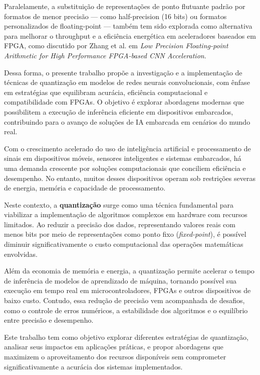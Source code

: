 \documentclass[12pt]{article}
\begin{document}
Paralelamente, a substituição de representações de ponto flutuante padrão por formatos de menor precisão — como half-precision (16 bits) ou formatos personalizados de floating-point — também tem sido explorada como alternativa para melhorar o throughput e a eficiência energética em aceleradores baseados em FPGA, como discutido por Zhang et al. em \textit{Low Precision Floating-point Arithmetic for High Performance FPGA-based CNN Acceleration}.

Dessa forma, o presente trabalho propõe a investigação e a implementação de técnicas de quantização em modelos de redes neurais convolucionais, com ênfase em estratégias que equilibram acurácia, eficiência computacional e compatibilidade com FPGAs. O objetivo é explorar abordagens modernas que possibilitem a execução de inferência eficiente em dispositivos embarcados, contribuindo para o avanço de soluções de IA embarcada em cenários do mundo real.

Com o crescimento acelerado do uso de inteligência artificial e processamento de sinais em dispositivos móveis, sensores inteligentes e sistemas embarcados, há uma demanda crescente por soluções computacionais que conciliem eficiência e desempenho. No entanto, muitos desses dispositivos operam sob restrições severas de energia, memória e capacidade de processamento.

Neste contexto, a \textbf{quantização} surge como uma técnica fundamental para viabilizar a implementação de algoritmos complexos em hardware com recursos limitados. Ao reduzir a precisão dos dados, representando valores reais com menos bits por meio de representações como ponto fixo (\textit{fixed-point}), é possível diminuir significativamente o custo computacional das operações matemáticas envolvidas.

Além da economia de memória e energia, a quantização permite acelerar o tempo de inferência de modelos de aprendizado de máquina, tornando possível sua execução em tempo real em microcontroladores, FPGAs e outros dispositivos de baixo custo. Contudo, essa redução de precisão vem acompanhada de desafios, como o controle de erros numéricos, a estabilidade dos algoritmos e o equilíbrio entre precisão e desempenho.

Este trabalho tem como objetivo explorar diferentes estratégias de quantização, analisar seus impactos em aplicações práticas, e propor abordagens que maximizem o aproveitamento dos recursos disponíveis sem comprometer significativamente a acurácia dos sistemas implementados.
\end{document}
